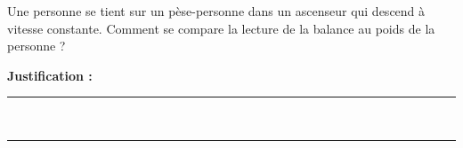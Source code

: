Une personne se tient sur un pèse-personne dans un ascenseur qui descend à vitesse constante. Comment se compare la lecture de la balance au poids de la personne ?

\choices

\noindent\textbf{Justification :} \hrulefill \\[2.5ex]
\rule{\linewidth}{0.4pt} \\[2.5ex]
\rule{\linewidth}{0.4pt}
\vfill
